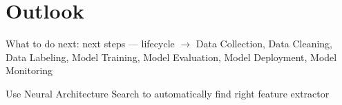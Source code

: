 \section{Outlook}
What to do next: next steps --- lifecycle
$\rightarrow$
Data Collection, Data Cleaning, Data Labeling, Model Training, Model Evaluation, Model Deployment,
Model Monitoring~\cite{watanabe_preliminary_2019}

Use Neural Architecture Search to automatically find right feature extractor~\citep{zhao_improving_2020}
